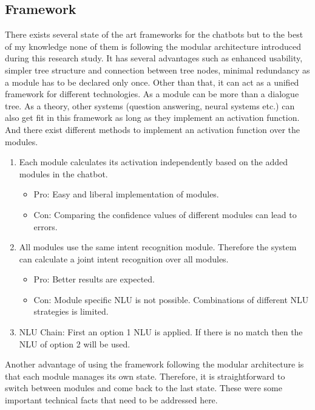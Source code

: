 \subsection{Framework}
There exists several state of the art frameworks for the chatbots but to the best of my knowledge none of them is following the modular architecture introduced during this research study. It has several advantages such as enhanced usability, simpler tree structure and connection between tree nodes, minimal redundancy as a module has to be declared only once. Other than that, it can act as a unified framework for different technologies. As a module can be more than a dialogue tree. As a theory, other systems (question answering, neural systems etc.) can also get fit in this framework as long as they implement an activation function. And there exist different methods to implement an activation function over the modules. 
\begin{enumerate}
    \item Each module calculates its activation independently based on the added modules in the chatbot.
    \begin{itemize}
        \item Pro: Easy and liberal implementation of modules.
        \item Con: Comparing the confidence values of different modules can lead to errors.
    \end{itemize}
    \item All modules use the same intent recognition module. Therefore the system can calculate a joint intent recognition over all modules.
    \begin{itemize}
        \item Pro: Better results are expected.
        \item Con: Module specific NLU is not possible. Combinations of different NLU strategies is limited.
    \end{itemize}
    \item NLU Chain: First an option 1 NLU is applied. If there is no match then the NLU of option 2 will be used.
\end{enumerate} 
Another advantage of using the framework following the modular architecture is that each module manages its own state. Therefore, it is straightforward to switch between modules and come back to the last state. These were some important technical facts that need to be addressed here.
\\~\\
